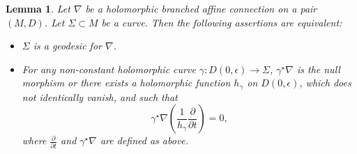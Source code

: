 \documentclass[10pt,a4paper]{amsart}
\newcommand{\der}[2]{\frac{\partial #1}{\partial#2}}
\numberwithin{equation}{section}
\newtheorem{Lemma}[Theorem]{Lemma}
\begin{document}
\begin{Lemma}\label{caracterisationbranchedgeodesics} Let $\nabla$ be a holomorphic branched affine connection on a pair $(M,D)$. Let $\Sigma \subset M$ be a curve. Then the following assertions are equivalent:
 \begin{itemize}\itemsep=0pt
 \item[$(i)$] $\Sigma$ is a geodesic for $\nabla$.
\item[$(ii)$] For any non-constant holomorphic curve $\gamma\colon D(0,\epsilon) \longrightarrow \Sigma$, $\gamma^\star \nabla$ is the null morphism or there exists a holomorphic function $h_\gamma$ on $D(0,\epsilon)$, which does not identically vanish, and such that
\[\gamma^\star \nabla\left(\frac{1}{h_\gamma} \der{}{t}\right) =0,\]
 where $\der{}{t}$ and $\gamma^\star \nabla$ are defined as above.
 \end{itemize}\end{Lemma}
\end{document}

